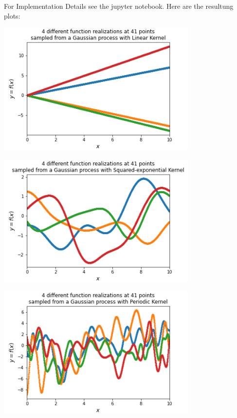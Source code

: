 For Implementation Details see the jupyter notebook. Here are the resultung plots:

    \includegraphics[width=0.75\textwidth]{Linear Kernel.png}
   

    \includegraphics[width=0.75\textwidth]{Squared-exponential Kernel.png}
   
    \includegraphics[width=0.75\textwidth]{Periodic Kernel.png}